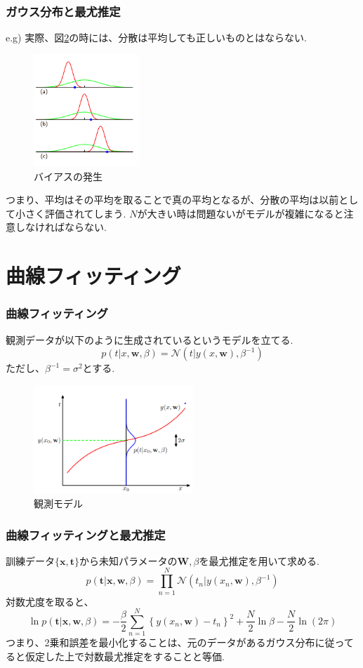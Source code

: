 \documentclass[uplatex,dvipdfmx,11pt,notheorems]{beamer}
\theoremstyle{definition}
\begin{document}
\begin{frame}\frametitle{ガウス分布と最尤推定}
	e.g) 実際、図\ref{fig1}の時には、分散は平均しても正しいものとはならない.
	\begin{figure}[tb]
	\centering
	\includegraphics[width=4cm,clip]{gauss1.png}
	\caption{バイアスの発生}
	\label{fig1}
	\end{figure}
	つまり、平均はその平均を取ることで真の平均となるが、分散の平均は以前として小さく評価されてしまう. $N$が大きい時は問題ないがモデルが複雑になると注意しなければならない.
\end{frame}

\section{曲線フィッティング}
\begin{frame}\frametitle{曲線フィッティング}
	観測データが以下のように生成されているというモデルを立てる.
	$$p(t | x, \mathbf{w}, \beta)=\mathcal{N}\left(t | y(x, \mathbf{w}), \beta^{-1}\right)$$
	ただし、$\beta^{-1} = \sigma^{2}$とする. 
	\begin{figure}[tb]
	\centering
	\includegraphics[width=6cm,clip]{gauss3.png}
	\caption{観測モデル}
	\label{fig1}
	\end{figure}
\end{frame}

\begin{frame}\frametitle{曲線フィッティングと最尤推定}
	訓練データ$\{\mathbf{x}, \mathbf{t}\}$から未知パラメータの$\mathbf{W},\beta$を最尤推定を用いて求める.
	$$p(\mathbf{t} | \mathbf{x}, \mathbf{w}, \beta)=\prod_{n=1}^{N} \mathcal{N}\left(t_{n} | y\left(x_{n}, \mathbf{w}\right), \beta^{-1}\right)$$
	対数尤度を取ると、
	$$\ln p(\mathbf{t} | \mathbf{x}, \mathbf{w}, \beta)=-\frac{\beta}{2} \sum_{n=1}^{N}\left\{y\left(x_{n}, \mathbf{w}\right)-t_{n}\right\}^{2}+\frac{N}{2} \ln \beta-\frac{N}{2} \ln (2 \pi)$$
	つまり、2乗和誤差を最小化することは、元のデータがあるガウス分布に従ってると仮定した上で対数最尤推定をすることと等価.
\end{frame}
\end{document}
